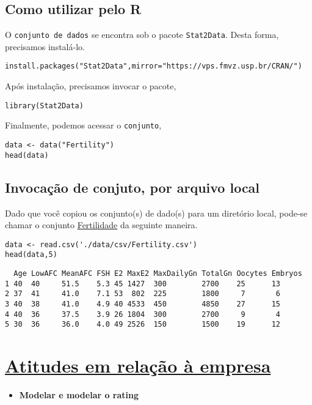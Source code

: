 \documentclass[12pt]{abntex2}
\begin{document}
\subsection{Como utilizar pelo R}
\label{sec:org4ba49af}
O \texttt{conjunto de dados} se encontra sob o pacote \texttt{Stat2Data}. Desta forma, precisamos
instalá-lo.

\begin{verbatim}
install.packages("Stat2Data",mirror="https://vps.fmvz.usp.br/CRAN/")
\end{verbatim}

Após instalação, precisamos invocar o pacote,
\begin{verbatim}
library(Stat2Data)
\end{verbatim}

Finalmente, podemos acessar o \texttt{conjunto},
\begin{verbatim}
data <- data("Fertility")
head(data)
\end{verbatim}
\subsection{Invocação de conjuto, por arquivo local}
\label{sec:org44743c6}

Dado que você copiou os conjunto(s) de dado(s) para um diretório
local, pode-se chamar o conjunto \href{https://drive.google.com/file/d/1iG15B5sUrntNJCjpIXT7Li1IHOlpvSKc/view?usp=sharing}{Fertilidade} da seguinte maneira.

\begin{verbatim}
data <- read.csv('./data/csv/Fertility.csv')
head(data,5)
\end{verbatim}

\begin{verbatim}
  Age LowAFC MeanAFC FSH E2 MaxE2 MaxDailyGn TotalGn Oocytes Embryos
1 40  40     51.5    5.3 45 1427  300        2700    25      13     
2 37  41     41.0    7.1 53  802  225        1800     7       6     
3 40  38     41.0    4.9 40 4533  450        4850    27      15     
4 40  36     37.5    3.9 26 1804  300        2700     9       4     
5 30  36     36.0    4.0 49 2526  150        1500    19      12     
\end{verbatim}

\section{\href{https://r-data.pmagunia.com/dataset/r-dataset-package-datasets-attitude}{Atitudes em relação à empresa}}
\label{sec:orgfea1fe2}
\begin{itemize}
\item \textbf{Modelar e modelar o rating}
\end{itemize}
\end{document}
